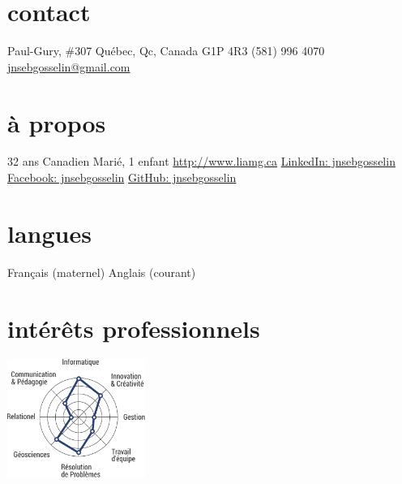 \documentclass[]{friggeri-cv} %
\def\github{\color{gray}{\FA \faGithubSign}}
\def\facebook{\color{gray}{\FA \faFacebookSign}}
\def\linkedin{\color{gray}{\FA \faLinkedinSign}}
\def\phoneb{\color{gray}{\FA \faPhoneSign}}
\def\home{\color{gray}{\FA \faHome}}
\def\mail{\color{gray}{\FA \faEnvelopeAlt}}
\def\globe{\color{gray}{\FA \faGlobe}}
\begin{document}
%
%
%
\begin{aside} %
	\section{contact}%
	    \vspace{5pt}
		\home{} Paul-Gury, \#307
		\hspace{0.43cm}Québec, Qc, Canada
		\hspace{0.43cm}G1P 4R3\vspace{5pt}
		\phoneb\space (581) 996 4070
		\href{mailto:jnsebgosselin@gmail.com}{\mail\space jnsebgosselin@gmail.com}
		\vspace{10pt}%
	\section{à propos}%
		\vspace{5pt}
		32 ans
		Canadien
		Marié, 1 enfant%
		\vspace{5pt}
		\href{http://www.liamg.ca/qui-sommes-nous/jean-sebastien-gosselin/}{\globe\hspace{0.1cm} http://www.liamg.ca}
		\href{https://www.linkedin.com/in/jnsebgosselin}{\linkedin\hspace{0.1cm} LinkedIn: jnsebgosselin}
		\href{https://www.facebook.com/jnsebgosselin}{\facebook\hspace{0.1cm} Facebook: jnsebgosselin}
		\href{https://github.com/jnsebgosselin}{\github\hspace{0.1cm} GitHub: jnsebgosselin}
		\vspace{10pt}%
	\section{langues}%
		\vspace{5pt}
		Français (maternel)
		Anglais (courant)
		\vspace{10pt}%
	\section{intérêts professionnels}%
		\vspace{10pt}
		\includegraphics[width=4.5cm]{prof_interests_graph}
		\vspace{5pt}%

\end{aside}
\end{document}
